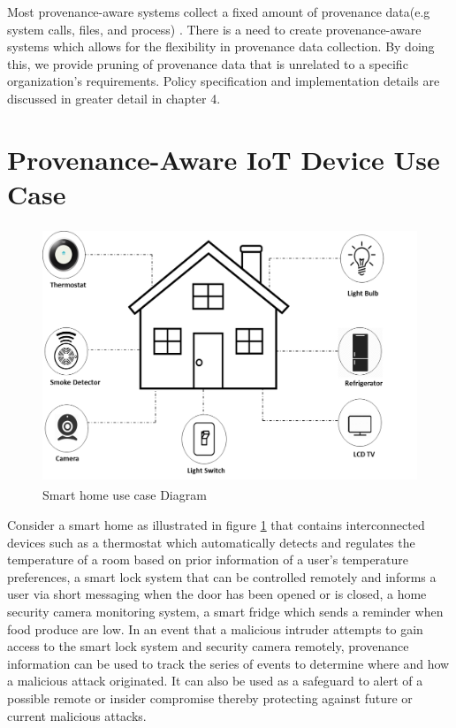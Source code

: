 Most provenance-aware systems collect a fixed amount of provenance data(e.g system calls, files, and process)  \cite{King:2003:BI:945445.945467, altintas,glavic_case_2011}. There is a need to create provenance-aware systems which allows for the flexibility in provenance data collection. By doing this, we provide pruning \cite{braun2006issues} of provenance data that is unrelated to a specific organization's requirements. Policy specification and implementation details are discussed in greater detail in chapter 4.  







\section{Provenance-Aware IoT Device Use Case}

\begin{figure}[h]
\begin{center}
\includegraphics[height=3in]{smart_h.png}
\end{center}
\caption{Smart home use case Diagram}
\label{smart_home}
\end{figure}


Consider a smart home as illustrated in figure \ref{smart_home} that contains interconnected devices such as a thermostat which automatically detects and regulates the temperature of a room based on prior information of a user's temperature preferences, a smart lock system that can be controlled remotely and informs a user via short messaging when the door has been opened or is closed, a home security camera monitoring system, a smart fridge which sends a reminder when food produce are low. In an event that a malicious intruder attempts  to gain access to the smart lock system and security camera remotely, provenance information can be used to track the series  of events to determine where and how a malicious attack originated. It can also be used as a safeguard to alert of a possible remote or insider compromise thereby protecting against future or current malicious attacks. 





